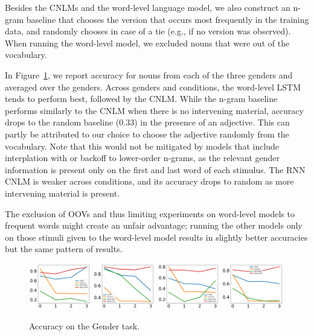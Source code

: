 Besides the CNLMs and the word-level language model, we also construct an n-gram baseline that chooses the version that occurs most frequently in the training data, and randomly chooses in case of a tie (e.g., if no version was observed).
When running the word-level model, we excluded nouns that were out of the vocabulary.

In Figure~\ref{fig:gender}, we report accuracy for nouns from each of the three genders and averaged over the genders.
Across genders and conditions, the word-level LSTM tends to perform best, followed by the CNLM.
While the n-gram baseline performs similarly to the CNLM when there is no intervening material, accuracy drops to the random baseline (0.33) in the presence of an adjective.
This can partly be attributed to our choice to choose the adjective randomly from the vocabulary.
Note that this would not be mitigated by models that include interplation with or backoff to lower-order n-grams, as the relevant gender information is present only on the first and last word of each stimulus.
The RNN CNLM is weaker across conditions, and its accuracy drops to random as more intervening material is present.

The exclusion of OOVs and thus limiting experiments on word-level models to frequent words might create an unfair advantage; running the other models only on those stimuli given to the word-level model results in slightly better accuracies but the same pattern of results.

\begin{figure}
\includegraphics[width=0.24\textwidth]{figures/german-gender-m.pdf}
\includegraphics[width=0.24\textwidth]{figures/german-gender-f.pdf}
\includegraphics[width=0.24\textwidth]{figures/german-gender-n.pdf}
\includegraphics[width=0.24\textwidth]{figures/german-gender-total.pdf}
\caption{Accuracy on the Gender task.}\label{fig:gender}
\end{figure}


